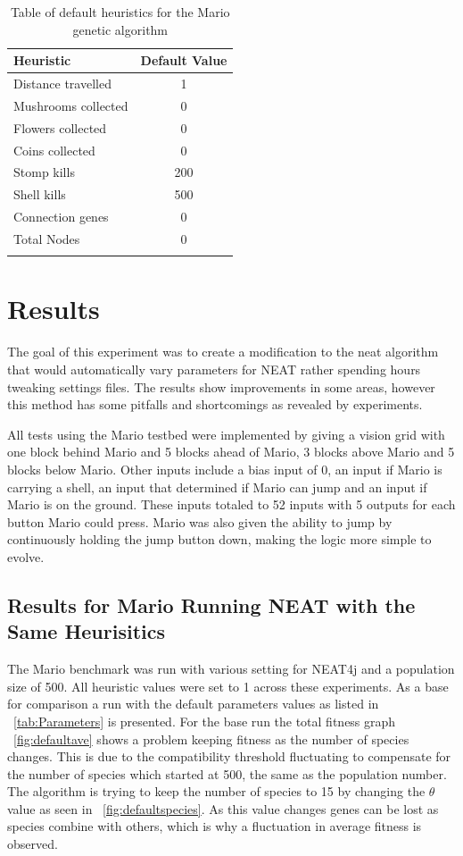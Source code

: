 \documentclass[12pt]{ucthesis} \newif\ifpdf \ifx\pdfoutput\undefined
\begin{document}
\begin{longtable}{| l | c |}
  \hline
  Heuristic & Default Value \\ \hline                   
  Distance travelled & 1  \\ \hline
  Mushrooms collected & 0 \\ \hline
  Flowers collected & 0  \\ \hline
  Coins collected & 0  \\ \hline
  Stomp kills & 200  \\ \hline
  Shell kills  & 500  \\ \hline
  Connection genes  & 0  \\ \hline
  Total Nodes  & 0  \\ \hline

\caption{Table of default heuristics for the Mario genetic
 algorithm}
\label{tab:Heuristics} 
\end{longtable}

\chapter{Results}
\label{chp:Results}

The goal of this experiment was to create a modification to the neat algorithm
that would automatically vary parameters for NEAT rather spending hours
tweaking settings files. The results show improvements in some areas, however
this method has some pitfalls and shortcomings as revealed by experiments.

All tests using the Mario testbed were implemented by giving a vision grid with
one block behind Mario and 5 blocks ahead of Mario, 3 blocks above Mario and 5
blocks below Mario. Other inputs include a bias input of 0, an input if Mario is
carrying a shell, an input that determined if Mario can jump and an input if
Mario is on the ground. These inputs totaled to 52 inputs with 5 outputs for each button Mario
could press. Mario was also given the ability to jump by continuously holding
the jump button down, making the logic more simple to evolve.

\section{Results for Mario Running NEAT with the Same Heurisitics}
The Mario benchmark was run with various setting for NEAT4j and a population
size of 500. All heuristic values were set to 1 across these experiments. As
a base for comparison a run with the default parameters values as listed in
~\ref{tab:Parameters} is presented. For the base run the total fitness graph
~\ref{fig:defaultave} shows a problem keeping fitness as the number of species
changes. This is due to the compatibility threshold fluctuating to compensate
for the number of species which started at 500, the same as the population
number. The algorithm is trying to keep the number of species to 15 by
changing the $\theta$ value as seen in ~\ref{fig:defaultspecies}. As this value
changes genes can be lost as species combine with others, which is why a
fluctuation in average fitness is observed.
\end{document}
